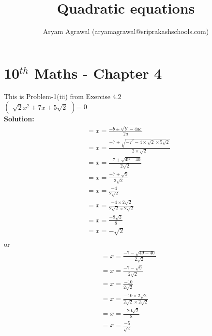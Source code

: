 \documentclass[12pt]{article}
\title{Quadratic equations}
\author{Aryam Agrawal (aryamagrawal@sriprakashschools.com)}
\newcommand{\myvec}[1]{\ensuremath{\begin{pmatrix}#1\end{pmatrix}}}
\newcommand{\solution}{\noindent \textbf{Solution: }}
\begin{document}
\section*{10$^{th}$ Maths - Chapter 4} 
This is Problem-1(iii) from Exercise 4.2\\
\myvec{{\sqrt{2}}x^2+{7} x +{5\sqrt{2}} }= 0\\

\solution\\
\begin{align}
&={x=\frac{-b\pm\sqrt{b^2-4ac}}{2a}}\\
&={x=\frac{-7\pm\sqrt{-7^2-4 \times \sqrt{2}\times5\sqrt{2}}}{2 \times \sqrt{2}}}\\
&={x=\frac{-7+\sqrt{49-40}}{2\sqrt{2}}}\\
&={x=\frac{-7+\sqrt{9}}{2\sqrt{2}}}\\
&={x=\frac{-4}{2\sqrt{2}}}\\
&={x=\frac{-4\times 2\sqrt{2}}{2\sqrt{2}\times2\sqrt{2}}}\\
&={x=\frac{-8\sqrt{2}}{8}}\\
&={x=-\sqrt{2}}\\
\end{align}
or\\
\begin{align}
&={x=\frac{-7-\sqrt{49-40}}{2\sqrt{2}}}\\
&={x=\frac{-7-\sqrt{9}}{2\sqrt{2}}}\\
&={x=\frac{-10}{2\sqrt{2}}}\\
&={x=\frac{-10\times 2\sqrt{2}}{2\sqrt{2}\times2\sqrt{2}}}\\
&={x=\frac{-20\sqrt{2}}{8}}\\
&={x=\frac{-5}{\sqrt{2}}}
\end{align}
\end{document}

